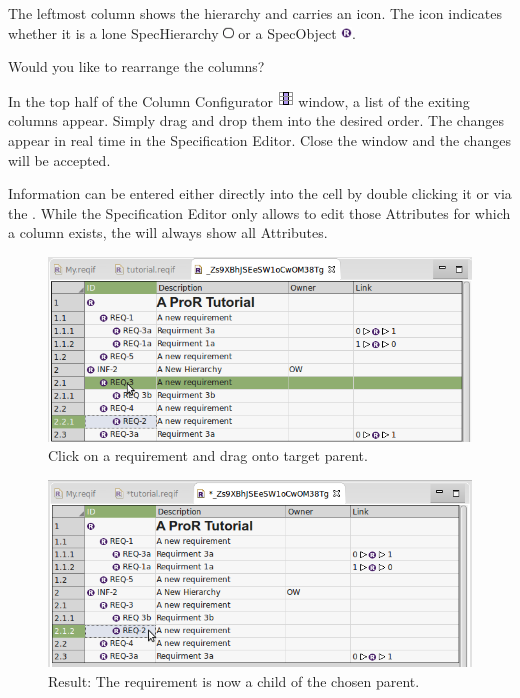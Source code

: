 The leftmost column shows the hierarchy and carries an icon.  The icon indicates whether it is a lone SpecHierarchy \includegraphics[height=0.8em]{../rmf-images/icons/full/obj16/spechierarchy.png} or a SpecObject \includegraphics[height=0.8em]{../rmf-images/icons/full/obj16/requirement.png}.

\begin{info}
Would you like to rearrange the columns?

In the top half of the Column Configurator {\includegraphics[scale=0.6]{../rmf-images/icons/full/obj16/Column.png}} window, a list of the exiting columns appear. Simply drag and drop them into the desired order. The changes appear in real time in the Specification Editor. Close the window and the changes will be accepted.
\end{info}

Information can be entered either directly into the cell by double clicking it or via the .  While the Specification Editor only allows to edit those Attributes for which a column exists, the  will always show all Attributes.

\begin{figure}
  \centering
  \includegraphics[width=0.8\linewidth]{../rmf-images/hierarchy_step_1.png}
  \caption{Click on a requirement and drag onto target parent.}
  \label{fig:hierarchy_step_1}
\end{figure}
\begin{figure}
  \centering
  \includegraphics[width=0.8\linewidth]{../rmf-images/hierarchy_step_2.png}
  \caption{Result: The requirement is now a child of the chosen parent.}
  \label{fig:hierarchy_step_2}
\end{figure}

